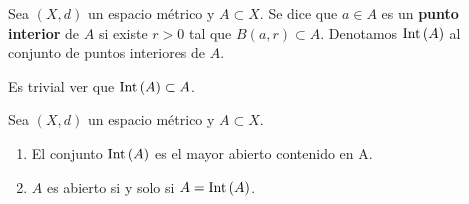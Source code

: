 \begin{definition}
Sea $\displaystyle \left(X,d\right) $ un espacio métrico y $\displaystyle A \subset X $. Se dice que $\displaystyle a \in A $ es un \textbf{punto interior} de $\displaystyle A $ si existe $\displaystyle r > 0 $ tal que $\displaystyle B\left(a,r\right) \subset A $. Denotamos $\displaystyle \operatorname{Int}\left(A\right) $ al conjunto de puntos interiores de $\displaystyle A $.
\end{definition}
\begin{observation}
Es trivial ver que $\displaystyle \operatorname{Int}\left(A\right) \subset A $. 
\end{observation}
\begin{prop}
Sea $\displaystyle \left(X,d\right) $ un espacio métrico y $\displaystyle A \subset X $.
\begin{enumerate}
\item El conjunto $\displaystyle \operatorname{Int}\left(A\right) $ es el mayor abierto contenido en A.
\item $\displaystyle A $ es abierto si y solo si $\displaystyle A = \operatorname{Int}\left(A\right) $.
\end{enumerate}
\end{prop}

